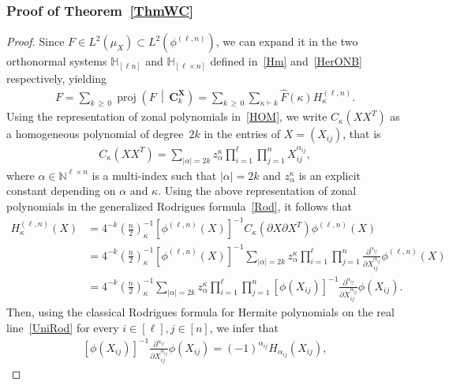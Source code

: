 \documentclass[AHL,Unicode,longabstracts,published]{cedram}
\DeclareMathOperator{\proj}{proj}
\newcommand{\bfX}{\mathbf{X}}
\newcommand{\bfC}{\mathbf{C}}
\newcommand{\N}{\mathbb{N}}
\newcommand{\bbH}{\mathbb{H}}
\begin{document}
\subsubsection*{Proof of Theorem~\ref{ThmWC}}
\begin{proof}
Since $F \in L^2(\mu_X) \subset L^2(\phi^{(\ell,n)})$, we can expand it in the two orthonormal systems $\bbH_{[\ell n]}$ and $\bbH_{[\ell \times n]}$ defined in~\eqref{Hm} and~\eqref{HerONB} respectively, yielding
\begin{gather}\label{WCEq}
F=\sum_{k\,\geq\,0} \proj\left(F\,\middle|\,\bfC_k^{\bfX}\right) = \sum_{k\,\geq\,0} \sum_{\kappa \vdash k}
\widehat{F}(\kappa) H_{\kappa}^{(\ell,n)}.
\end{gather}
Using the representation of zonal polynomials in~\eqref{HOM}, we write $C_{\kappa}(XX^T)$ as a homogeneous polynomial of degree~$2k$ in the entries of $X=(X_{ij})$, that is
\begin{gather*}
C_{\kappa}\left(XX^T\right) = \sum_{|\alpha|=2k} z_{\alpha}^{\kappa} \prod_{i=1}^{\ell} \prod_{j=1}^n X_{ij}^{\alpha_{ij}},
\end{gather*}
where $\alpha\in \N^{\ell \times n}$ is a multi-index such that $|\alpha|=2k$ and $z_{\alpha}^{\kappa}$ is an explicit constant depending on $\alpha$ and $\kappa$. Using the above representation of zonal polynomials in the generalized Rodrigues formula~\eqref{Rod}, it follows that
\begin{align*}
H_{\kappa}^{(\ell,n)}(X) &= 4^{-k} \left(\frac{n}{2}\right)_{\kappa}^{-1} \left[\phi^{(\ell,n)}(X)\right]^{-1} C_{\kappa}\left(\partial X\partial X^T\right) \phi^{(\ell,n)}(X) \\
&= 4^{-k} \left(\frac{n}{2}\right)_{\kappa}^{-1} \left[\phi^{(\ell,n)}(X)\right]^{-1} \sum_{|\alpha|=2k} z_{\alpha}^{\kappa} \prod_{i=1}^{\ell} \prod_{j=1}^n \frac{\partial^{\alpha_{ij}}}{\partial X_{ij}^{\alpha_{ij}}} \phi^{(\ell,n)}(X) \\
&= 4^{-k} \left(\frac{n}{2}\right)_{\kappa}^{-1} \sum_{|\alpha|=2k} z_{\alpha}^{\kappa} \prod_{i=1}^{\ell} \prod_{j=1}^n \left[\phi(X_{ij})\right]^{-1} \frac{\partial^{\alpha_{ij}}}{\partial X_{ij}^{\alpha_{ij}}} \phi(X_{ij}).
\end{align*}
Then, using the classical Rodrigues formula for Hermite polynomials on the real line~\eqref{UniRod} for every $i\in [\ell], j\in [n]$, we infer that
\begin{gather*}
\left[\phi(X_{ij})\right]^{-1} \frac{\partial^{\alpha_{ij}}}{\partial X_{ij}^{\alpha_{ij}}} \phi(X_{ij}) = (-1)^{\alpha_{ij}} H_{\alpha_{ij}}(X_{ij}),

\end{gather*}
\end{proof}
\end{document}
